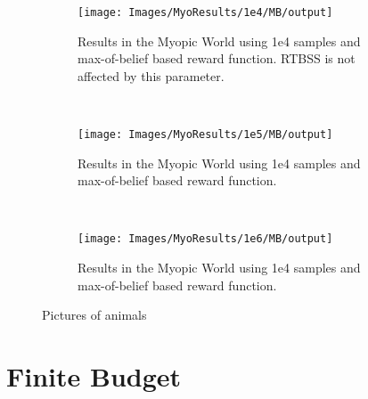 \begin{figure}[h]
        \centering
        \begin{subfigure}[t]{0.3\textwidth}
                \texttt{[image: Images/MyoResults/1e4/MB/output]}
                \caption{Results in the Myopic World using 1e4 samples and max-of-belief based
                reward function. RTBSS is not affected by this parameter.}
                \label{fig:m4m}
        \end{subfigure}%
        ~ %
        \begin{subfigure}[t]{0.3\textwidth}
                \texttt{[image: Images/MyoResults/1e5/MB/output]}
                \caption{Results in the Myopic World using 1e4 samples and max-of-belief based
                reward function.}
                \label{fig:m5m}
        \end{subfigure}
        ~ %
        \begin{subfigure}[t]{0.3\textwidth}
                \texttt{[image: Images/MyoResults/1e6/MB/output]}
                \caption{Results in the Myopic World using 1e4 samples and max-of-belief based
                reward function.}
                \label{fig:m6m}
        \end{subfigure}
        \caption{Pictures of animals}\label{fig:mm}
\end{figure}

\clearpage
\section{Finite Budget}

